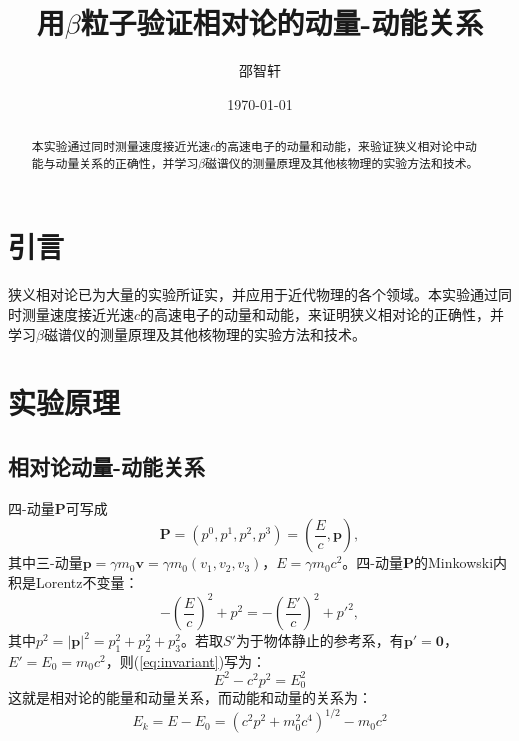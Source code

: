 \documentclass[aps,pre,12pt,preprint,onecolumn,showpacs,showkeys]{revtex4-1}
\begin{document}
\title{\bf\heiti{}用$\beta$粒子验证相对论的动量-动能关系\vspace{15mm}}
\author{\fangsong{}邵智轩\vspace{2mm}}
\date{\today}

\begin{abstract}
\vspace{10mm}
\begin{spacing}{1.5}
\songti{}
本实验通过同时测量速度接近光速$c$的高速电子的动量和动能，来验证狭义相对论中动能与动量关系的正确性，并学习$\beta$磁谱仪的测量原理及其他核物理的实验方法和技术。

\end{spacing}
\end{abstract}
\maketitle
\songti{}

\section{引言}
    狭义相对论已为大量的实验所证实，并应用于近代物理的各个领域。本实验通过同时测量速度接近光速$c$的高速电子的动量和动能，来证明狭义相对论的正确性，并学习$\beta$磁谱仪的测量原理及其他核物理的实验方法和技术。

\section{实验原理}
    \subsection{相对论动量-动能关系}
    四-动量$\bm{P}$可写成
    \begin{equation}
        \bm{P}=(p^0, p^1, p^2, p^3)=(\frac{E}{c}, \bm{p}),
    \end{equation}
    其中三-动量$\bm p=\gamma m_0 \bm v =\gamma m_0 (v_1, v_2, v_3)$，$E=\gamma m_0 c^2$。四-动量$\bm P$的Minkowski内积是Lorentz不变量：
    \begin{equation}
        -(\frac{E}{c})^2+p^2=-(\frac{E'}{c})^2+p'^2,\label{eq:invariant}
    \end{equation}
    其中$p^2=|\bm p|^2=p_1^2+p_2^2+p_3^2$。若取$S'$为于物体静止的参考系，有$\bm {p'}=\bm{0}$，$E'=E_0=m_0 c^2$，则(\ref{eq:invariant})写为：
    \begin{equation}
        E^2-c^2 p^2 =E_0^2
    \end{equation}
    这就是相对论的能量和动量关系，而动能和动量的关系为：
    \begin{equation}
        E_k=E-E_0=(c^2p^2+m_0 ^2 c^4)^{1/2}-m_0 c^2\label{eq:relationship}
    \end{equation}
\end{document}
